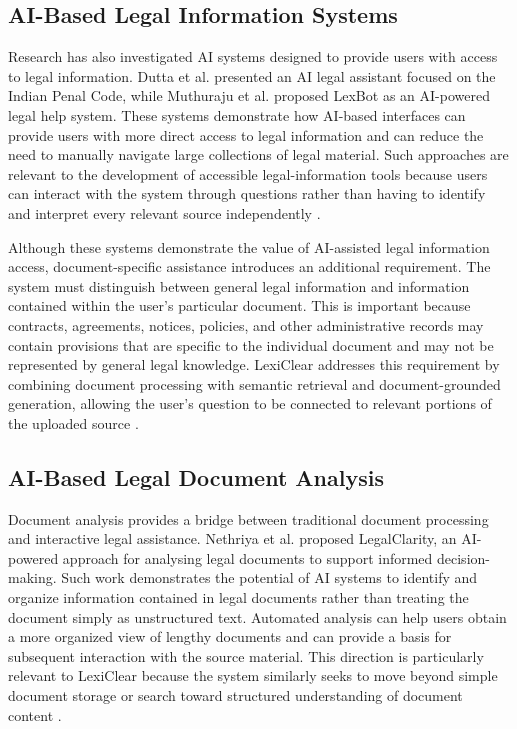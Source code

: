 \documentclass[12pt,a4paper,oneside]{report}
\begin{document}
\subsection{AI-Based Legal Information Systems}

Research has also investigated AI systems designed to provide users with
access to legal information. Dutta et al. presented an AI legal assistant
focused on the Indian Penal Code, while Muthuraju et al. proposed LexBot as
an AI-powered legal help system. These systems demonstrate how AI-based
interfaces can provide users with more direct access to legal information
and can reduce the need to manually navigate large collections of legal
material. Such approaches are relevant to the development of accessible
legal-information tools because users can interact with the system through
questions rather than having to identify and interpret every relevant source
independently
\cite{dutta2024,muthuraju2025}.

Although these systems demonstrate the value of AI-assisted legal information
access, document-specific assistance introduces an additional requirement.
The system must distinguish between general legal information and information
contained within the user's particular document. This is important because
contracts, agreements, notices, policies, and other administrative records
may contain provisions that are specific to the individual document and may
not be represented by general legal knowledge. LexiClear addresses this
requirement by combining document processing with semantic retrieval and
document-grounded generation, allowing the user's question to be connected
to relevant portions of the uploaded source
\cite{dutta2024,muthuraju2025,jurisai2025}.

\subsection{AI-Based Legal Document Analysis}

Document analysis provides a bridge between traditional document processing
and interactive legal assistance. Nethriya et al. proposed LegalClarity, an
AI-powered approach for analysing legal documents to support informed
decision-making. Such work demonstrates the potential of AI systems to
identify and organize information contained in legal documents rather than
treating the document simply as unstructured text. Automated analysis can
help users obtain a more organized view of lengthy documents and can provide
a basis for subsequent interaction with the source material. This direction
is particularly relevant to LexiClear because the system similarly seeks to
move beyond simple document storage or search toward structured
understanding of document content
\cite{nethriya2024}.
\end{document}
